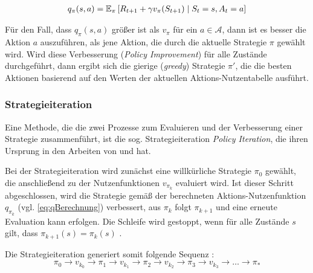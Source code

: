 \begin{equation}\label{eq:qBerechnung}
    \begin{aligned}
        q_\pi(s,a) = \operatorname{\mathbb{E}}_\pi\left[ R_{t+1} + \gamma v_\pi(S_{t+1}) \mid S_t = s, A_t=a\right]
    \end{aligned}
\end{equation}

Für den Fall, dass $q_\pi(s,a)$ größer ist als $v_\pi$ für ein $a \in \mathcal{A}$, dann ist es besser die Aktion $a$ auszuführen, als jene Aktion, die durch die aktuelle Strategie $\pi$ gewählt wird. Wird diese Verbesserung (\textit{Policy Improvement}) für alle Zustände durchgeführt, dann ergibt sich die gierige (\textit{greedy}) Strategie $\pi'$, die die besten Aktionen basierend auf den Werten der aktuellen Aktions-Nutzentabelle ausführt.

\subsubsection{Strategieiteration}
Eine Methode, die die zwei Prozesse zum Evaluieren und der Verbesserung einer Strategie zusammenführt, ist die sog. Strategieiteration \textit{Policy Iteration}, die ihren Ursprung in den Arbeiten von \cite{bellman1957dynamic} und \cite{howard1960dynamic} hat. 
\par 
Bei der Strategieiteration wird zunächst eine willkürliche Strategie $\pi_0$ gewählt, die anschließend zu der Nutzenfunktionen $v_{\pi_k}$ evaluiert wird. Ist dieser Schritt abgeschlossen, wird die Strategie gemäß der berechneten Aktions-Nutzenfunktion $q_{\pi_k}$ (vgl. \ref{eq:qBerechnung}) verbessert, aus $\pi_k$ folgt $\pi_{k+1}$ und eine erneute Evaluation kann erfolgen. Die Schleife wird gestoppt, wenn für alle Zustände $s$ gilt, dass $\pi_{k+1}(s) = \pi_k(s)$ \cite[S.~22]{Wiering}. 
\par 
Die Strategieiteration generiert somit folgende Sequenz \cite[S.~22]{Wiering}:
\begin{equation}\label{eq:policyItSeq}
\pi_0 \rightarrow v_{k_0} \rightarrow  \pi_1 \rightarrow v_{k_1} \rightarrow  \pi_2 \rightarrow v_{k_2}\rightarrow  \pi_3 \rightarrow v_{k_3}\rightarrow \dots \rightarrow \pi_*
\end{equation}


